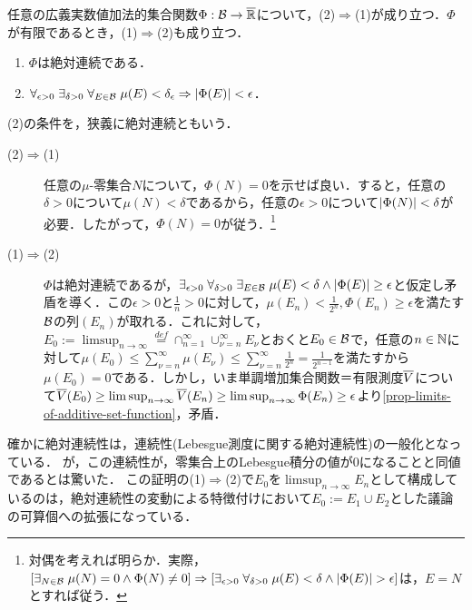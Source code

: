 \documentclass[uplatex, dvipdfmx]{jsreport}
\begin{document}
\begin{theorem}
    任意の広義実数値加法的集合関数$\Phi:\mathcal{B}\to\overline{\mathbb{R}}$について，(2)$\Rightarrow$(1)が成り立つ．$\Phi$が有限であるとき，(1)$\Rightarrow$(2)も成り立つ．
    \begin{enumerate}
        \item $\Phi$は絶対連続である．
        \item $\forall_{\epsilon>0}\;\exists_{\delta>0}\;\forall_{E\in\mathcal{B}}\;\mu(E)<\delta_\epsilon\Rightarrow\lvert\Phi(E)\rvert<\epsilon$．
    \end{enumerate}
    (2)の条件を，狭義に絶対連続ともいう\cite{吉田耕作}．
\end{theorem}
\begin{Proof}\mbox{}
    \begin{description}
        \item[(2)$\Rightarrow$(1)] 任意の$\mu$-零集合$N$について，$\Phi(N)=0$を示せば良い．すると，任意の$\delta>0$について$\mu(N)<\delta$であるから，任意の$\epsilon>0$について$\lvert\Phi(N)\rvert<\delta$が必要．したがって，$\Phi(N)=0$が従う．\footnote{対偶を考えれば明らか．実際，$[\exists_{N\in\mathcal{B}}\;\mu(N)=0\land\Phi(N)\ne 0]\Rightarrow[\exists_{\epsilon>0}\;\forall_{\delta>0}\;\mu(E)<\delta\land\lvert\Phi(E)\rvert>\epsilon]$は，$E=N$とすれば従う．}
        \item[(1)$\Rightarrow$(2)] $\Phi$は絶対連続であるが，$\exists_{\epsilon>0}\;\forall_{\delta>0}\;\exists_{E\in\mathcal{B}}\;\mu(E)<\delta\land\lvert\Phi(E)\rvert\ge\epsilon$と仮定し矛盾を導く．この$\epsilon>0$と$\frac{1}{n}>0$に対して，$\mu(E_n)<\frac{1}{2^n},\Phi(E_n)\ge\epsilon$を満たす$\mathcal{B}$の列$(E_n)$が取れる．これに対して，$E_0:=\limsup_{n\to\infty}\overset{def}{=}\cap_{n=1}^\infty\cup_{\nu=n}^\infty E_\nu$とおくと$E_0\in\mathcal{B}$で，任意の$n\in\mathbb{N}$に対して$\mu(E_0)\le\sum^\infty_{\nu=n}\mu(E_\nu)\le\sum^\infty_{\nu=n}\frac{1}{2^n}=\frac{1}{2^{n-1}}$を満たすから$\mu(E_0)=0$である．しかし，いま単調増加集合関数＝有限測度$\overline{V}$について$\overline{V}(E_0)\ge\limsup_{n\to\infty}\overline{V}(E_n)\ge\limsup_{n\to\infty}\Phi(E_n)\ge\epsilon$より\ref{prop-limits-of-additive-set-function}，矛盾．
    \end{description}
\end{Proof}
\begin{remarks}
    確かに絶対連続性は，連続性(Lebesgue測度に関する絶対連続性)の一般化となっている．
    が，この連続性が，零集合上のLebesgue積分の値が$0$になることと同値であるとは驚いた．
    この証明の(1)$\Rightarrow$(2)で$E_0$を$\limsup_{n\to\infty}E_n$として構成しているのは，絶対連続性の変動による特徴付けにおいて$E_0:=E_1\cup E_2$とした議論の可算個への拡張になっている．
\end{remarks}
\end{document}
